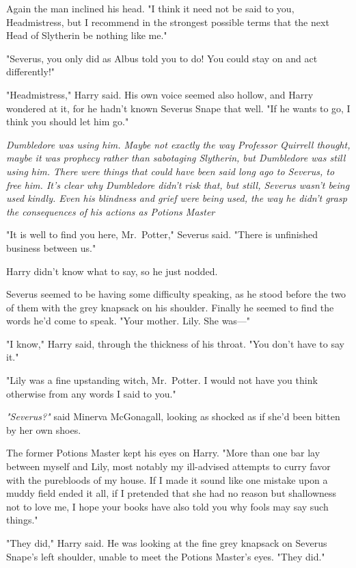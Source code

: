 Again the man inclined his head. "I think it need not be said to you,
Headmistress, but I recommend in the strongest possible terms that the next
Head of Slytherin be nothing like me."

"Severus, you only did as Albus told you to do! You could stay on and act
differently!"

"Headmistress," Harry said. His own voice seemed also hollow, and Harry
wondered at it, for he hadn't known Severus Snape that well. "If he wants to
go, I think you should let him go."

\emph{Dumbledore was using him. Maybe not exactly the way Professor Quirrell
thought, maybe it was prophecy rather than sabotaging Slytherin, but Dumbledore
was still using him. There were things that could have been said long ago to
Severus, to free him. It's clear why Dumbledore didn't risk that, but still,
Severus wasn't being used kindly. Even his blindness and grief were being used,
the way he didn't grasp the consequences of his actions as Potions
Master{\el}}

"It is well to find you here, Mr.~Potter," Severus said. "There is unfinished
business between us."

Harry didn't know what to say, so he just nodded.

Severus seemed to be having some difficulty speaking, as he stood before the
two of them with the grey knapsack on his shoulder. Finally he seemed to find
the words he'd come to speak. "Your mother. Lily. She was\mbox{---}"

"I know," Harry said, through the thickness of his throat. "You don't have to
say it."

"Lily was a fine upstanding witch, Mr.~Potter. I would not have you think
otherwise from any words I said to you."

\emph{"Severus?"} said Minerva McGonagall, looking as shocked as if she'd been
bitten by her own shoes.

The former Potions Master kept his eyes on Harry. "More than one bar lay
between myself and Lily, most notably my ill-advised attempts to curry favor
with the purebloods of my house. If I made it sound like one mistake upon a
muddy field ended it all, if I pretended that she had no reason but shallowness
not to love me, I hope your books have also told you why fools may say such
things."

"They did," Harry said. He was looking at the fine grey knapsack on Severus
Snape's left shoulder, unable to meet the Potions Master's eyes. "They did."

